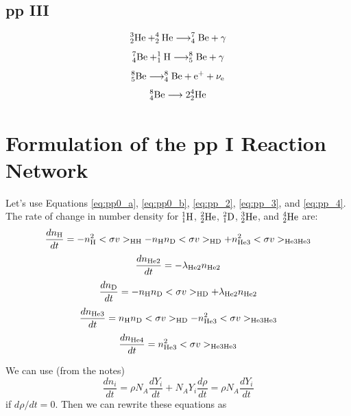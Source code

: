 \documentclass[12pt,preprint]{aastex}
\begin{document}
\subsection{pp III}

\begin{equation}
^3_2{\rm He} + ^4_2{\rm He} \longrightarrow ^7_4{\rm Be} + \gamma
\end{equation}
\begin{equation}
^7_4{\rm Be} + ^1_1{\rm H} \longrightarrow ^8_5{\rm Be} + \gamma
\end{equation}
\begin{equation}
^8_5{\rm Be} \longrightarrow ^8_4{\rm Be} + {\rm e}^+ + \nu_{\rm e}
\end{equation}
\begin{equation}
^8_4{\rm Be} \longrightarrow 2 ^4_2{\rm He}
\end{equation}

\section{Formulation of the pp I Reaction Network}

Let's use Equations \ref{eq:pp0_a}, \ref{eq:pp0_b}, \ref{eq:pp_2}, \ref{eq:pp_3}, and \ref{eq:pp_4}. The rate of change in number density for $^1_1{\rm H}$, $^2_2{\rm He}$, $^2_1{\rm D}$, $^3_2{\rm He}$, and $^4_2{\rm He}$ are:
\begin{equation}
\frac{dn_{\rm H}}{dt} = - n_{\rm H}^2 <\sigma v>_{\rm HH} - n_{\rm H} n_{\rm D}<\sigma v>_{\rm H D} + n_{\rm He 3}^2 <\sigma v>_{\rm He3 He3}
\label{eq:rate_1}
\end{equation}
\begin{equation}
\frac{dn_{\rm He2}}{dt} = -\lambda_{\rm He2} n_{\rm He2}
\label{eq:rate_2}
\end{equation}
\begin{equation}
\frac{dn_{\rm D}}{dt} = - n_{\rm H} n_{\rm D} <\sigma v>_{\rm HD} + \lambda_{\rm He2} n_{\rm He2}
\label{eq:rate_3}
\end{equation}
\begin{equation}
\frac{dn_{\rm He3}}{dt} = n_{\rm H} n_{\rm D} <\sigma v>_{\rm HD} - n_{\rm He3}^2 <\sigma v>_{\rm He3He3} 
\label{eq:rate_4}
\end{equation}
\begin{equation}
\frac{dn_{\rm He4}}{dt} = n_{\rm He3}^2 <\sigma v>_{\rm He3He3} 
\label{eq:rate_5}
\end{equation}

We can use (from the notes)
\begin{equation}
\frac{dn_i}{dt} = \rho N_A \frac{dY_i}{dt} + N_A Y_i \frac{d \rho}{dt} = \rho N_A \frac{dY_i}{dt}
\end{equation}
if $d\rho/dt = 0$. Then we can rewrite these equations as
\end{document}
